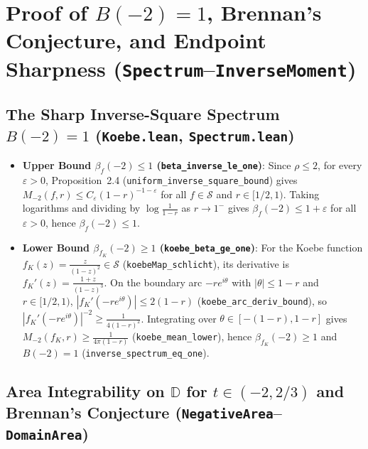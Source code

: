 \documentclass[11pt,reqno]{amsart}
\theoremstyle{definition}
\newcommand{\D}{\mathbb{D}}
\newcommand{\Sclass}{\mathcal{S}}
\begin{document}
\section{Proof of $B(-2)=1$, Brennan's Conjecture, and Endpoint Sharpness (\texttt{Spectrum}--\texttt{InverseMoment})}

\subsection{The Sharp Inverse-Square Spectrum $B(-2)=1$ (\texttt{Koebe.lean}, \texttt{Spectrum.lean})}

\begin{itemize}
\item \textbf{Upper Bound $\beta_f(-2) \le 1$ (\texttt{beta\_inverse\_le\_one})}:
Since $\rho \le 2$, for every $\varepsilon > 0$, Proposition~2.4 (\texttt{uniform\_inverse\_square\_bound}) gives $M_{-2}(f,r) \le C_\varepsilon (1-r)^{-1-\varepsilon}$ for all $f \in \Sclass$ and $r \in [1/2, 1)$. Taking logarithms and dividing by $\log\frac{1}{1-r}$ as $r \to 1^-$ gives $\beta_f(-2) \le 1+\varepsilon$ for all $\varepsilon > 0$, hence $\beta_f(-2) \le 1$.
\item \textbf{Lower Bound $\beta_{f_K}(-2) \ge 1$ (\texttt{koebe\_beta\_ge\_one})}:
For the Koebe function $f_K(z) = \frac{z}{(1-z)^2} \in \Sclass$ (\texttt{koebeMap\_schlicht}), its derivative is $f_K'(z) = \frac{1+z}{(1-z)^3}$. On the boundary arc $-r e^{i\theta}$ with $|\theta| \le 1-r$ and $r \in [1/2,1)$, $|f_K'(-r e^{i\theta})| \le 2(1-r)$ (\texttt{koebe\_arc\_deriv\_bound}), so $|f_K'(-r e^{i\theta})|^{-2} \ge \frac{1}{4(1-r)^2}$. Integrating over $\theta \in [-(1-r), 1-r]$ gives $M_{-2}(f_K, r) \ge \frac{1}{4\pi(1-r)}$ (\texttt{koebe\_mean\_lower}), hence $\beta_{f_K}(-2) \ge 1$ and $B(-2) = 1$ (\texttt{inverse\_spectrum\_eq\_one}).
\end{itemize}

\subsection{Area Integrability on $\D$ for $t \in (-2, 2/3)$ and Brennan's Conjecture (\texttt{NegativeArea}--\texttt{DomainArea})}
\end{document}
